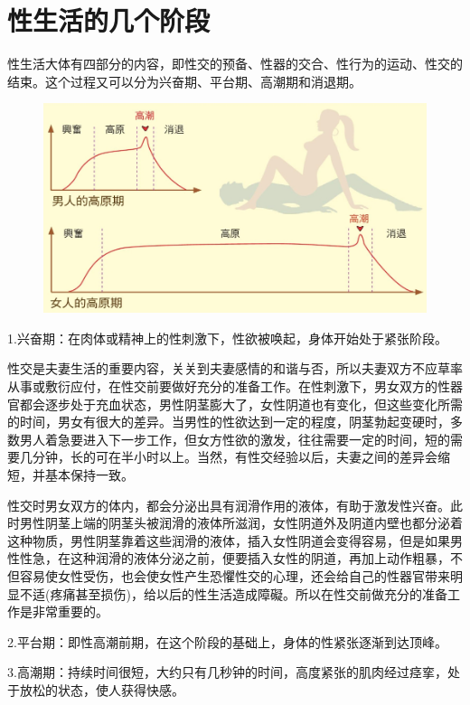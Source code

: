 \documentclass[12pt,UTF8]{ctexbook}
\begin{document}
\chapter{性生活的几个阶段}

性生活大体有四部分的内容，即性交的预备、性器的交合、性行为的运动、性交的结束。这个过程又可以分为兴奋期、平台期、高潮期和消退期。

\begin{figure}[htbp]
	\includegraphics[width=1\linewidth]{6}
	\caption{}
	\label{fig:1}
\end{figure}

1.兴奋期：在肉体或精神上的性刺激下，性欲被唤起，身体开始处于紧张阶段。

性交是夫妻生活的重要内容，关关到夫妻感情的和谐与否，所以夫妻双方不应草率从事或敷衍应付，在性交前要做好充分的准备工作。在性刺激下，男女双方的性器官都会逐步处于充血状态，男性阴茎膨大了，女性阴道也有变化，但这些变化所需的时间，男女有很大的差异。当男性的性欲达到一定的程度，阴茎勃起变硬时，多数男人着急要进入下一步工作，但女方性欲的激发，往往需要一定的时间，短的需要几分钟，长的可在半小时以上。当然，有性交经验以后，夫妻之间的差异会缩短，并基本保持一致。

性交时男女双方的体内，都会分泌出具有润滑作用的液体，有助于激发性兴奋。此时男性阴茎上端的阴茎头被润滑的液体所滋润，女性阴道外及阴道内壁也都分泌着这种物质，男性阴茎靠着这些润滑的液体，插入女性阴道会变得容易，但是如果男性性急，在这种润滑的液体分泌之前，便要插入女性的阴道，再加上动作粗暴，不但容易使女性受伤，也会使女性产生恐懼性交的心理，还会给自己的性器官带来明显不适(疼痛甚至损伤)，给以后的性生活造成障礙。所以在性交前做充分的准备工作是非常重要的。

2.平台期：即性高潮前期，在这个阶段的基础上，身体的性紧张逐渐到达顶峰。

3.高潮期：持续时间很短，大约只有几秒钟的时间，高度紧张的肌肉经过痉挛，处于放松的状态，使人获得快感。
\end{document}
